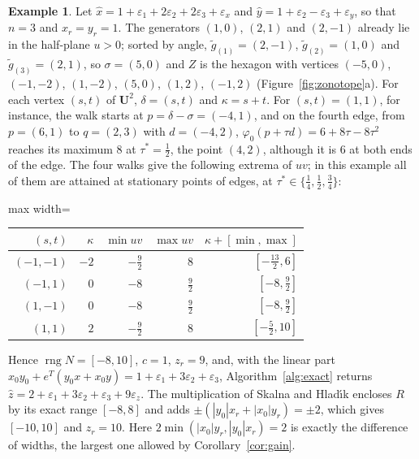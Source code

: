 \documentclass[10pt]{article}
\theoremstyle{definition}
\newtheorem{example}{Example}
\newcommand{\U}{\mathbf{U}}
\newcommand{\eps}{\varepsilon}
\newcommand{\ex}{\eps_x}
\newcommand{\ey}{\eps_y}
\newcommand{\rng}{\operatorname{rng}}
\begin{document}
\begin{example}
\label{ex:alg}
Let $\hat x=1+\eps_1+2\eps_2+2\eps_3+\ex$ and $\hat y=1+\eps_2-\eps_3+\ey$, so that $n=3$ and $x_r=y_r=1$. The generators $(1,0)$, $(2,1)$ and $(2,-1)$ already lie in the half-plane $u>0$; sorted by angle, $\tilde g_{(1)}=(2,-1)$, $\tilde g_{(2)}=(1,0)$ and $\tilde g_{(3)}=(2,1)$, so $\sigma=(5,0)$ and $Z$ is the hexagon with vertices $(-5,0)$, $(-1,-2)$, $(1,-2)$, $(5,0)$, $(1,2)$, $(-1,2)$ (Figure~\ref{fig:zonotope}a). For each vertex $(s,t)$ of $\U^2$, $\delta=(s,t)$ and $\kappa=s+t$. For $(s,t)=(1,1)$, for instance, the walk starts at $p=\delta-\sigma=(-4,1)$, and on the fourth edge, from $p=(6,1)$ to $q=(2,3)$ with $d=(-4,2)$, $\varphi_0(p+\tau d)=6+8\tau-8\tau^2$ reaches its maximum $8$ at $\tau^*=\tfrac12$, the point $(4,2)$, although it is $6$ at both ends of the edge. The four walks give the following extrema of $uv$; in this example all of them are attained at stationary points of edges, at $\tau^*\in\{\tfrac14,\tfrac12,\tfrac34\}$:
\begin{center}
\small
\begin{adjustbox}{max width=\linewidth}\begin{tabular}{rrrrr}
\toprule
$(s,t)$ & $\kappa$ & $\min uv$ & $\max uv$ & $\kappa+[\min,\max]$ \\
\midrule
$(-1,-1)$ & $-2$ & $-\tfrac92$ & $8$ & $[-\tfrac{13}2,6]$ \\
$(-1,1)$ & $0$ & $-8$ & $\tfrac92$ & $[-8,\tfrac92]$ \\
$(1,-1)$ & $0$ & $-8$ & $\tfrac92$ & $[-8,\tfrac92]$ \\
$(1,1)$ & $2$ & $-\tfrac92$ & $8$ & $[-\tfrac52,10]$ \\
\bottomrule
\end{tabular}\end{adjustbox}
\end{center}
Hence $\rng N=[-8,10]$, $c=1$, $z_r=9$, and, with the linear part $x_0y_0+e^T(y_0x+x_0y)=1+\eps_1+3\eps_2+\eps_3$, Algorithm~\ref{alg:exact} returns $\hat z=2+\eps_1+3\eps_2+\eps_3+9\eps_z$. The multiplication of Skalna and Hlad\'{\i}k encloses $R$ by its exact range $[-8,8]$ and adds $\pm(|y_0|x_r+|x_0|y_r)=\pm2$, which gives $[-10,10]$ and $z_r=10$. Here $2\min(|x_0|y_r,|y_0|x_r)=2$ is exactly the difference of widths, the largest one allowed by Corollary~\ref{cor:gain}.
\end{example}
\end{document}
